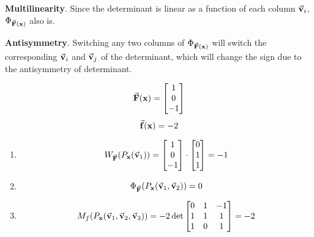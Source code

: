 \documentclass{homework}
\begin{document}
\begin{problem}{7}
  \textbf{Multilinearity}.
  Since the determinant is linear as a function of each column $\vec{\mathbf{v}}_i$,
  $\Phi_{\vec{\mathbf{F}}(\mathbf{x})}$ also is.

  \textbf{Antisymmetry}.
  Switching any two columns of $\Phi_{\vec{\mathbf{F}}(\mathbf{x})}$ will switch
  the corresponding $\vec{\mathbf{v}}_i$ and $\vec{\mathbf{v}}_j$ of the determinant,
  which will change the sign due to the antisymmetry of determinant. \QED
\end{problem}

\begin{problem}{8}
  $$\vec{\mathbf{F}}(\mathbf{x}) = \begin{bmatrix}1 \\ 0 \\ -1\end{bmatrix}$$
  $$\vec{\mathbf{f}}(\mathbf{x}) = -2$$
  \begin{enumerate}
    \item
    $$W_{\vec{\mathbf{F}}}(P_{\mathbf{x}}(\vec{\mathbf{v}}_1))
    = \begin{bmatrix}1 \\ 0 \\ -1\end{bmatrix} \cdot \begin{bmatrix}0 \\ 1 \\ 1\end{bmatrix}
    = -1$$

    \item
    $$\Phi_{\vec{\mathbf{F}}}(P_{\mathbf{x}}(\vec{\mathbf{v}}_1, \vec{\mathbf{v}}_2))
    = 0$$

    \item
    $$M_f(P_{\mathbf{x}}(\vec{\mathbf{v}}_1, \vec{\mathbf{v}}_2, \vec{\mathbf{v}}_3))
    = -2 \det \begin{bmatrix}0 & 1 & -1 \\ 1 & 1 & 1 \\ 1 & 0 & 1\end{bmatrix} = -2$$
  \end{enumerate}
\end{problem}
\end{document}

